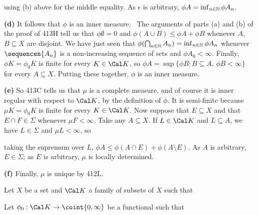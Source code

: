 {

\noindent using (b) above for the middle equality.   As $\epsilon$ is
arbitrary, $\phi A=\inf_{n\in\Bbb N}\phi A_n$.\ \Qed

\medskip

{\bf (d)} It follows that $\phi$ is an inner measure.
\Prf\ The arguments of parts (a) and (b) of the proof of 413H tell us
that
$\phi\emptyset=0$ and $\phi(A\cup B)\le\phi A+\phi B$ whenever $A$,
$B\subseteq X$ are disjoint.   We have just seen that
$\phi(\bigcap_{n\in\Bbb N}A_n)=\inf_{n\in\Bbb N}\phi A_n$ whenever
$\sequencen{A_n}$ is a non-increasing sequence of sets and $\phi
A_0<\infty$.
Finally, $\phi K=\phi_0K$ is finite for every $K\in\Cal
K$, so $\phi A=\sup\{\phi B:B\subseteq A,\,\phi B<\infty\}$ for every
$A\subseteq X$.   Putting these together, $\phi$ is an inner measure.\
\Qed

\medskip

{\bf (e)} So 413C tells us that $\mu$ is a complete measure, and of
course it is inner regular with respect to $\Cal K$, by the definition
of $\phi$.   It is semi-finite because $\mu K=\phi_0K$ is finite for
every $K\in\Cal K$.   Now suppose that
$E\subseteq X$ and that $E\cap F\in \Sigma$ whenever $\mu F<\infty$.
Take any $A\subseteq X$.   If $L\in\Cal K$ and $L\subseteq A$, we have
$L\in\Sigma$ and $\mu L<\infty$, so


\noindent taking the supremum over $L$,
$\phi A\le\phi(A\cap E)+\phi(A\setminus E)$.   As $A$ is arbitrary,
$E\in\Sigma$;  as $E$ is arbitrary, $\mu$ is locally determined.

\medskip

{\bf (f)} Finally, $\mu$ is unique by 412L.
}%

 Let $X$ be a set and $\Cal K$ a family of subsets
of $X$ such that




\noindent Let $\phi_0:\Cal K\to\coint{0,\infty}$ be a
functional such that

